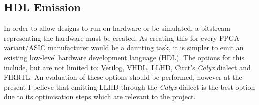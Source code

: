 \subsection{HDL Emission}
In order to allow designs to run on hardware or be simulated, a bitstream representing the hardware must be created. As creating this for every FPGA variant/ASIC manufacturer would be a daunting task, it is simpler to emit an existing low-level hardware development language (HDL). The options for this include, but are not limited to: Verilog, VHDL, LLHD, Circt's \textit{Calyx} dialect and FIRRTL. An evaluation of these options should be performed, however at the present I believe that emitting LLHD through the \textit{Calyx} dialect is the best option due to its optimisation steps which are relevant to the project.
